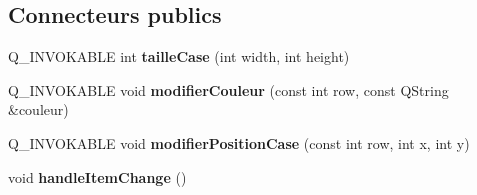 \subsection*{Connecteurs publics}
\begin{DoxyCompactItemize}
\item 
Q\+\_\+\+I\+N\+V\+O\+K\+A\+B\+LE int {\bfseries taille\+Case} (int width, int height)\hypertarget{class_map_adfce28a7d4767783e1b7799e5bf6b52e}{}\label{class_map_adfce28a7d4767783e1b7799e5bf6b52e}

\item 
Q\+\_\+\+I\+N\+V\+O\+K\+A\+B\+LE void {\bfseries modifier\+Couleur} (const int row, const Q\+String \&couleur)\hypertarget{class_map_a300d7c1c06a76869fc42beeabcc22484}{}\label{class_map_a300d7c1c06a76869fc42beeabcc22484}

\item 
Q\+\_\+\+I\+N\+V\+O\+K\+A\+B\+LE void {\bfseries modifier\+Position\+Case} (const int row, int x, int y)\hypertarget{class_map_a55963c26007f1414023a058d10748221}{}\label{class_map_a55963c26007f1414023a058d10748221}

\item 
void {\bfseries handle\+Item\+Change} ()\hypertarget{class_map_a7d2fbfcebc184bd902939ea55a40b5de}{}\label{class_map_a7d2fbfcebc184bd902939ea55a40b5de}

\end{DoxyCompactItemize}
